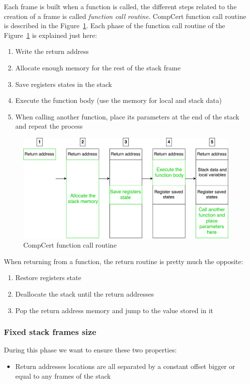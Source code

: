 \documentclass[11pt]{sdm}
\begin{document}
Each frame is built when a function is called, the different steps related to the creation of a frame is called \textit{function call routine}.
CompCert function call routine is described in the Figure~\ref{call_routine}. Each phase of the function call routine of the Figure~\ref{call_routine} is explained just here:
\begin{enumerate}
	\item Write the return address
	\item Allocate enough memory for the rest of the stack frame
	\item Save registers states in the stack
	\item Execute the function body (use the memory for local and stack data)
	\item When calling another function, place its parameters at the end of the stack and repeat the process
\end{enumerate}

\begin{figure}[!ht]
\centering
\includegraphics[scale=0.55]{images/call_routine.pdf}
\caption{CompCert function call routine}
\label{call_routine}
\end{figure}

When returning from a function, the return routine is pretty much the opposite:
\begin{enumerate}
	\item Restore registers state
	\item Deallocate the stack until the return addresses
	\item Pop the return address memory and jump to the value stored in it
\end{enumerate}


\subsubsection{Fixed stack frames size}
\label{sub:Fixed stack frames size}
During this phase we want to ensure these two properties:
\begin{itemize}
	\item Return addresses locations are all separated by a constant offset bigger or equal to any frames of the stack
\end{itemize}
\end{document}
